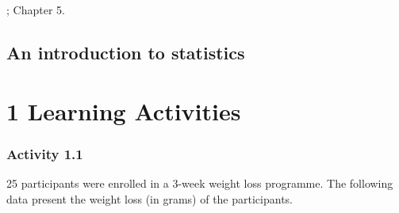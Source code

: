 \documentclass[
]{memoir}
\begin{document}
\citep{acock10}; Chapter 5.

\hypertarget{an-introduction-to-statistics}{%
\section{An introduction to statistics}\label{an-introduction-to-statistics}}

\hypertarget{learning-activities}{%
\chapter*{\texorpdfstring{\textbf{1} Learning Activities}{1 Learning Activities}}\label{learning-activities}}

\hypertarget{activity-1.1}{%
\subsection*{Activity 1.1}\label{activity-1.1}}

25 participants were enrolled in a 3-week weight loss programme. The following data present the weight loss (in grams) of the participants.

 
  \providecommand{\huxb}[2]{\arrayrulecolor[RGB]{#1}\global\arrayrulewidth=#2pt}
  \providecommand{\huxvb}[2]{\color[RGB]{#1}\vrule width #2pt}
  \providecommand{\huxtpad}[1]{\rule{0pt}{#1}}
  \providecommand{\huxbpad}[1]{\rule[-#1]{0pt}{#1}}
\end{document}
